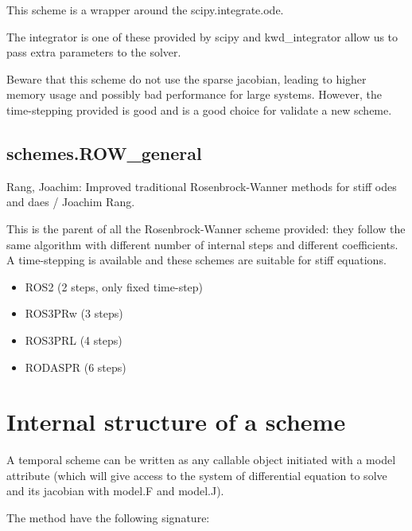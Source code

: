 \documentclass[letterpaper,10pt,english]{sphinxmanual}
\begin{document}
This scheme is a wrapper around the scipy.integrate.ode.

The integrator is one of these provided by scipy and kwd\_integrator allow us to pass extra parameters to the solver.

Beware that this scheme do not use the sparse jacobian, leading to higher memory usage and possibly bad performance for large systems. However, the time-stepping provided is good and is a good choice for validate a new scheme.


\subsection{schemes.ROW\_general}
\label{\detokenize{schemes:schemes-row-general}}
Rang, Joachim: Improved traditional Rosenbrock-Wanner methods for stiff odes and daes / Joachim Rang.

This is the parent of all the Rosenbrock-Wanner scheme provided: they follow the same algorithm with different number of internal steps and different coefficients. A time-stepping is available and these schemes are suitable for stiff equations.
\begin{itemize}
\item {} 
ROS2 (2 steps, only fixed time-step)

\item {} 
ROS3PRw (3 steps)

\item {} 
ROS3PRL (4 steps)

\item {} 
RODASPR (6 steps)

\end{itemize}


\section{Internal structure of a scheme}
\label{\detokenize{schemes:internal-structure-of-a-scheme}}
A temporal scheme can be written as any callable object initiated with a model attribute (which will give access to the system of differential equation to solve and its jacobian with model.F and model.J).

The  method have the following signature:

\begin{sphinxVerbatim}[commandchars=\\\{\}]
      
                        
\end{sphinxVerbatim}
\end{document}
